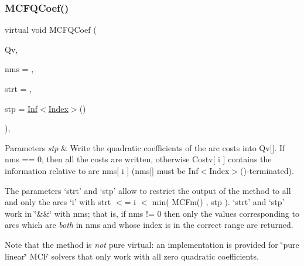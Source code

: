 \subsubsection{\texorpdfstring{M\+C\+F\+Q\+Coef()}{MCFQCoef()}\hspace{0.1cm}{\footnotesize\ttfamily [1/3]}}
{\footnotesize\ttfamily virtual void M\+C\+F\+Q\+Coef (\begin{DoxyParamCaption}\item[{\mbox{\hyperlink{class_m_c_f_class_a62409402be4e4b301e1a568f99f877be}{C\+Row}}}]{Qv,  }\item[{\mbox{\hyperlink{class_m_c_f_class_a81575b2d4e4d5636b17170432150ae69}{c\+Index\+\_\+\+Set}}}]{nms = {},  }\item[{\mbox{\hyperlink{class_m_c_f_class_a76aaabb20535c51a2752b93f6c38fe54}{c\+Index}}}]{strt = {},  }\item[{\mbox{\hyperlink{class_m_c_f_class_ad53d6229d7ec28555a9c9c2fd9abf773}{Index}}}]{stp = {\ttfamily \mbox{\hyperlink{class_o_p_ttypes__di__unipi__it_1_1_inf}{Inf}}$<$\mbox{\hyperlink{class_m_c_f_class_ad53d6229d7ec28555a9c9c2fd9abf773}{Index}}$>$()} }\end{DoxyParamCaption})\hspace{0.3cm}{\ttfamily [inline]}, {\ttfamily [virtual]}}


\begin{DoxyParams}{Parameters}
{\em stp} & Write the quadratic coefficients of the arc costs into Qv\mbox{[}\mbox{]}. If nms == 0, then all the costs are written, otherwise Costv\mbox{[} i \mbox{]} contains the information relative to arc nms\mbox{[} i \mbox{]} (nms\mbox{[}\mbox{]} must be Inf$<$\+Index$>$()-\/terminated).\\
\hline
\end{DoxyParams}
The parameters `strt' and `stp' allow to restrict the output of the method to all and only the arcs `i' with strt $<$= i $<$ min( M\+C\+Fm() , stp ). `strt' and `stp' work in \char`\"{}\&\&\char`\"{} with nms; that is, if nms != 0 then only the values corresponding to arcs which are {\itshape both} in nms and whose index is in the correct range are returned.

Note that the method is {\itshape not} pure virtual\+: an implementation is provided for \char`\"{}pure linear\char`\"{} M\+CF solvers that only work with all zero quadratic coefficients. \mbox{\label{class_m_c_f_class_ab9227949082669e0e9ca0c545406f1f4}} 
